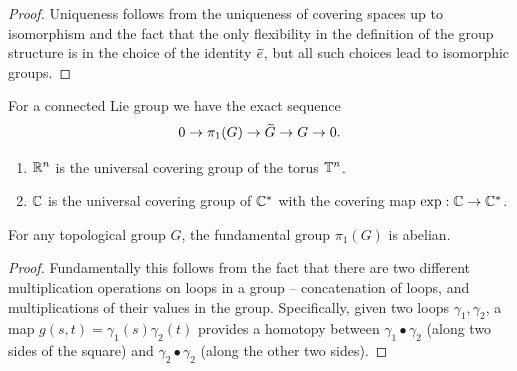 \begin{proof}

    
    Uniqueness follows from the uniqueness of covering spaces up to isomorphism and the fact that the only flexibility in the definition of the group structure is in the choice of the identity $\wt e$, but all such choices lead to isomorphic groups.
\end{proof}

\begin{cor}
    For a connected Lie group we have the exact sequence
    \[0\to \pi_1(G)\to \wt{G}\to G\to 0.\]
\end{cor}

\begin{example}
    \begin{enumerate}[label=(\alph*)]
        \item $\mathbb{R}^n$ is the universal covering group of the torus $\mathbb{T}^n$.
        \item $\mathbb{C}$ is the universal covering group of $\mathbb{C}^\ast$ with the covering map $\exp:\mathbb{C}\to\mathbb{C}^\ast$.
    \end{enumerate}
\end{example}


\begin{prop}
    For any topological group $G$, the fundamental group $\pi_1(G)$ is abelian.
\end{prop}
\begin{proof}
    Fundamentally this follows from the fact that there are two different multiplication operations on loops in a group -- concatenation of loops, and multiplications of their values in the group. Specifically, given two loops $\gamma_1,\gamma_2$, a map $g(s,t)=\gamma_1(s)\gamma_2(t)$ provides a homotopy between $\gamma_1\bullet \gamma_2$ (along two sides of the square) and $\gamma_2\bullet\gamma_2$ (along the other two sides).
\end{proof}

